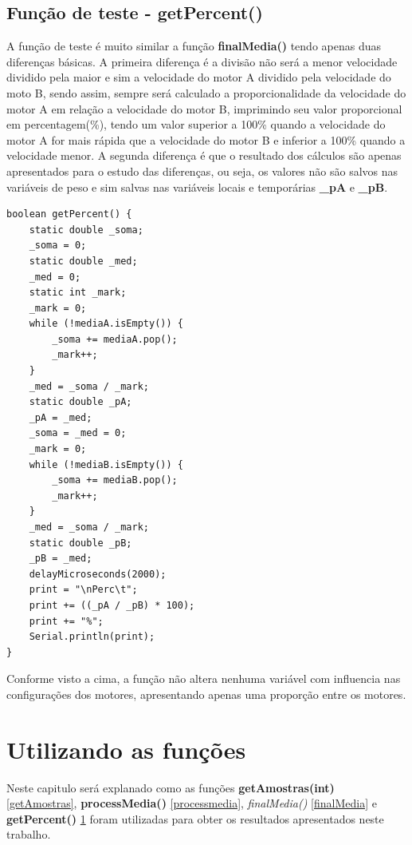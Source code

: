 \documentclass[a4paper,12pt,portuguese]{ufms-cpcx}
\begin{document}
\section{Função de teste - getPercent()}\label{getPercent}
A função de teste é muito similar a função \textbf{finalMedia()} tendo apenas duas diferenças básicas. A primeira diferença é a divisão não será a menor velocidade dividido pela maior e sim a velocidade do motor A dividido pela velocidade do moto B, sendo assim, sempre será calculado a proporcionalidade da velocidade do motor A em relação a velocidade do motor B, imprimindo seu valor proporcional em percentagem(\%), tendo um valor superior a 100\% quando a velocidade do motor A for mais rápida que a velocidade do motor B e inferior a 100\% quando a velocidade menor.
A segunda diferença é que o resultado dos cálculos são apenas apresentados para o estudo das diferenças, ou seja, os valores não são salvos nas variáveis de peso e sim salvas nas variáveis locais e temporárias \textbf{\_pA} e \textbf{\_pB}.
\begin{lstlisting}
boolean getPercent() {
	static double _soma;
	_soma = 0;
	static double _med;
	_med = 0;
	static int _mark;
	_mark = 0;
	while (!mediaA.isEmpty()) {
		_soma += mediaA.pop();
		_mark++;
	}
	_med = _soma / _mark;
	static double _pA;
	_pA = _med;
	_soma = _med = 0;
	_mark = 0;
	while (!mediaB.isEmpty()) {
		_soma += mediaB.pop();
		_mark++;
	}
	_med = _soma / _mark;
	static double _pB;
	_pB = _med;
	delayMicroseconds(2000);
	print = "\nPerc\t";
	print += ((_pA / _pB) * 100);
	print += "%";
	Serial.println(print);
}
\end{lstlisting}
Conforme visto a cima, a função não altera nenhuma variável com influencia nas configurações dos motores, apresentando apenas uma proporção entre os motores.

\chapter{Utilizando as funções}\label{howto}
Neste capitulo será explanado como as funções \textbf{getAmostras(int)} \ref{getAmostras}, \textbf{processMedia()} \ref{processmedia}, \textit{finalMedia()} \ref{finalMedia} e \textbf{getPercent()} \ref{getPercent} foram utilizadas para obter os resultados apresentados neste trabalho.
\end{document}
